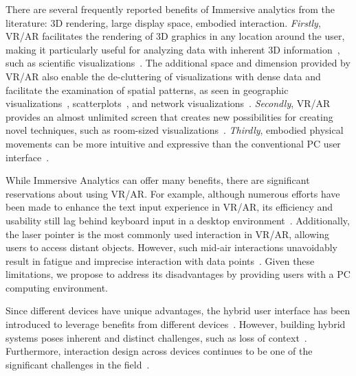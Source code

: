 There are several frequently reported benefits of Immersive analytics from the literature: 3D rendering, large display space, embodied interaction.
\emph{Firstly}, VR/AR facilitates the rendering of 3D graphics in any location around the user, making it particularly useful for analyzing data with inherent 3D information~\cite{brath20143d}, such as scientific visualizations~\cite{el2019virtual}. 
The additional space and dimension provided by VR/AR also enable the de-cluttering of visualizations with dense data and facilitate the examination of spatial patterns, as seen in geographic visualizations~\cite{yang2018origin}, scatterplots~\cite{kraus2019impact,bach2017hologram}, and network visualizations~\cite{kwon2016study}.
\emph{Secondly}, VR/AR provides an almost unlimited screen that creates new possibilities for creating novel techniques, such as room-sized visualizations~\cite{yang2018maps,kraus2019impact}. 
\emph{Thirdly}, embodied physical movements can be more intuitive and expressive than the conventional PC user interface~\cite{cordeil2017imaxes,yang2020tilt,liu2023datadancing,tong2022exploring,hurter2018fiberclay}. 

While Immersive Analytics can offer many benefits, there are significant reservations about using VR/AR.
For example, although numerous efforts have been made to enhance the text input experience in VR/AR, its efficiency and usability still lag behind keyboard input in a desktop environment~\cite{speicher2018selection}.
Additionally, the laser pointer is the most commonly used interaction in VR/AR, allowing users to access distant objects. However, such mid-air interactions unavoidably result in fatigue and imprecise interaction with data points~\cite{cordeil2020embodied}. 
Given these limitations, we propose to address its disadvantages by providing users with a PC computing environment.

Since different devices have unique advantages, the hybrid user interface has been introduced to leverage benefits from different devices~\cite{feiner1991hybrid}. However, building hybrid systems poses inherent and distinct challenges, such as loss of context~\cite{hubenschmid2021towards}. 
Furthermore, interaction design across devices continues to be one of the significant challenges in the field~\cite{ens2021grand}.

